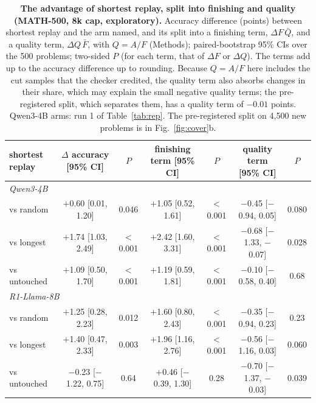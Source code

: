 \documentclass[10pt]{article}
\begin{document}
\begin{table}[t]
\centering\small
\caption{\textbf{The advantage of shortest replay, split into finishing and quality (MATH-500, 8k cap, exploratory).} Accuracy difference (points) between shortest replay and the arm named, and its split into a finishing term, $\Delta F\,\bar{Q}$, and a quality term, $\Delta Q\,\bar{F}$, with $Q=A/F$ (Methods); paired-bootstrap 95\% CIs over the 500 problems; two-sided $P$ (for each term, that of $\Delta F$ or $\Delta Q$). The terms add up to the accuracy difference up to rounding. Because $Q=A/F$ here includes the cut samples that the checker credited, the quality term also absorbs changes in their share, which may explain the small negative quality terms; the pre-registered split, which separates them, has a quality term of $-0.01$ points. Qwen3-4B arms: run 1 of Table~\ref{tab:rep}. The pre-registered split on 4{,}500 new problems is in Fig.~\ref{fig:cover}b.}
\label{tab:decomp}
\setlength{\tabcolsep}{4.5pt}
\begin{tabular}{lcccccc}
\toprule
shortest replay & $\Delta$ accuracy [95\% CI] & $P$ & finishing term [95\% CI] & $P$ & quality term [95\% CI] & $P$ \\
\midrule
\multicolumn{7}{l}{\textit{Qwen3-4B}} \\
\quad vs random & $+$0.60 [0.01, 1.20] & 0.046 & $+$1.05 [0.52, 1.61] & $<$0.001 & $-$0.45 [$-$0.94, 0.05] & 0.080 \\
\quad vs longest & $+$1.74 [1.03, 2.49] & $<$0.001 & $+$2.42 [1.60, 3.31] & $<$0.001 & $-$0.68 [$-$1.33, $-$0.07] & 0.028 \\
\quad vs untouched & $+$1.09 [0.50, 1.70] & $<$0.001 & $+$1.19 [0.59, 1.81] & $<$0.001 & $-$0.10 [$-$0.58, 0.40] & 0.68 \\
\multicolumn{7}{l}{\textit{R1-Llama-8B}} \\
\quad vs random & $+$1.25 [0.28, 2.23] & 0.012 & $+$1.60 [0.80, 2.43] & $<$0.001 & $-$0.35 [$-$0.94, 0.23] & 0.23 \\
\quad vs longest & $+$1.40 [0.47, 2.33] & 0.003 & $+$1.96 [1.16, 2.76] & $<$0.001 & $-$0.56 [$-$1.16, 0.03] & 0.060 \\
\quad vs untouched & $-$0.23 [$-$1.22, 0.75] & 0.64 & $+$0.46 [$-$0.39, 1.30] & 0.28 & $-$0.70 [$-$1.37, $-$0.03] & 0.039 \\
\bottomrule
\end{tabular}
\end{table}
\end{document}
